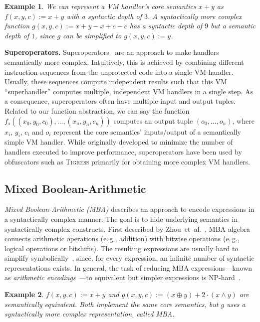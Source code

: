 \documentclass[letterpaper,twocolumn,10pt]{article}
\newcommand{\etal}{et~al.\xspace}
\newcommand{\eg}{e.\,g.,\xspace}
\theoremstyle{customexample}
\newtheorem{example}{Example}
\theoremstyle{customexperiment}
\newcommand{\tigress}{\textsc{Tigress}\xspace}
\begin{document}
\begin{example}
We can represent a VM handler's core semantics $x+y$ as $f(x, y, c) := x + y$ with a syntactic depth of $3$.  A syntactically more complex function $g(x,y, c) := x + y - x + c - c$ has a syntactic depth of $9$ but a semantic depth of $1$, since $g$ can be simplified to $g(x,y,c) := y$.
\end{example}


\textbf{Superoperators.}\label{paragraph:superoperators}
Superoperators~\cite{superoperators} are an approach to make handlers semantically more complex. Intuitively, this is achieved by combining different instruction sequences from the unprotected code into a single VM handler. 
Usually, these sequences compute independent results such that this VM \enquote{superhandler} computes multiple, independent VM handlers in a single step. As a consequence, superoperators often have multiple input and output tuples.
Related to our function abstraction, we can say the function $f_s((x_0, y_0, c_0), \dots, (x_n, y_n, c_n))$ computes an output tuple $(o_0, \dots, o_n)$, where $x_i$, $y_i$, $c_i$ and $o_i$ represent the core semantics' inputs/output of a semantically simple VM handler. While originally developed to minimize the number of handlers executed to improve performance, superoperators have been used by obfuscators such as \tigress primarily for obtaining more complex VM handlers.






\subsection{Mixed Boolean-Arithmetic}
\emph{Mixed Boolean-Arithmetic (MBA)} describes an approach to encode expressions in a syntactically complex manner. The goal is to hide underlying semantics in syntactically complex constructs. First described by Zhou~\etal~\cite{zhou2007information}, MBA algebra connects arithmetic operations (\eg addition) with bitwise operations (\eg logical operations or bitshifts). The resulting expressions are usually hard to simplify symbolically~\cite{eyrolles2017dissertation,xu2021boosting}, since, for every expression, an infinite number of syntactic representations exists. In general, the task of reducing MBA expressions---known as \emph{arithmetic encodings}~\cite{banescu2016code}---to equivalent but simpler expressions is NP-hard~\cite{zhou2007information}.

\begin{example}
$f(x, y, c) := x + y$ and $g(x, y, c) := (x \oplus y) + 2 \cdot (x \land y)$ are semantically equivalent. 
Both implement the same core semantics, but $g$ uses a syntactically more complex representation, called MBA.
\end{example}
\end{document}
